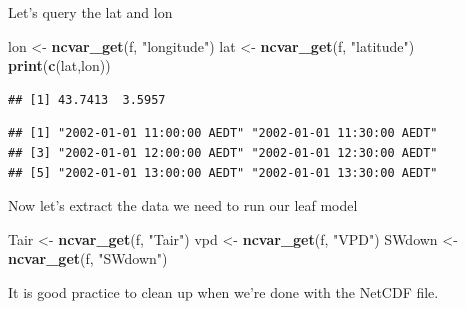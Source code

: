 \documentclass[]{article}
\newenvironment{Shaded}{\begin{snugshade}}{\end{snugshade}}
\newcommand{\DataTypeTok}[1]{\textcolor[rgb]{0.13,0.29,0.53}{#1}}
\newcommand{\DecValTok}[1]{\textcolor[rgb]{0.00,0.00,0.81}{#1}}
\newcommand{\KeywordTok}[1]{\textcolor[rgb]{0.13,0.29,0.53}{\textbf{#1}}}
\newcommand{\NormalTok}[1]{#1}
\newcommand{\OperatorTok}[1]{\textcolor[rgb]{0.81,0.36,0.00}{\textbf{#1}}}
\newcommand{\StringTok}[1]{\textcolor[rgb]{0.31,0.60,0.02}{#1}}
\begin{document}
Let's query the lat and lon

\begin{Shaded}
\begin{Highlighting}[]
\NormalTok{lon <-}\StringTok{ }\KeywordTok{ncvar_get}\NormalTok{(f, }\StringTok{"longitude"}\NormalTok{)}
\NormalTok{lat <-}\StringTok{ }\KeywordTok{ncvar_get}\NormalTok{(f, }\StringTok{"latitude"}\NormalTok{)}
\KeywordTok{print}\NormalTok{(}\KeywordTok{c}\NormalTok{(lat,lon))}
\end{Highlighting}
\end{Shaded}

\begin{verbatim}
## [1] 43.7413  3.5957
\end{verbatim}

\begin{Shaded}
\end{Shaded}

\begin{verbatim}
## [1] "2002-01-01 11:00:00 AEDT" "2002-01-01 11:30:00 AEDT"
## [3] "2002-01-01 12:00:00 AEDT" "2002-01-01 12:30:00 AEDT"
## [5] "2002-01-01 13:00:00 AEDT" "2002-01-01 13:30:00 AEDT"
\end{verbatim}

Now let's extract the data we need to run our leaf model

\begin{Shaded}
\begin{Highlighting}[]
\NormalTok{Tair <-}\StringTok{ }\KeywordTok{ncvar_get}\NormalTok{(f, }\StringTok{"Tair"}\NormalTok{) }
\NormalTok{vpd <-}\StringTok{ }\KeywordTok{ncvar_get}\NormalTok{(f, }\StringTok{"VPD"}\NormalTok{)}
\NormalTok{SWdown <-}\StringTok{ }\KeywordTok{ncvar_get}\NormalTok{(f, }\StringTok{"SWdown"}\NormalTok{)}
\end{Highlighting}
\end{Shaded}

It is good practice to clean up when we're done with the NetCDF file.
\end{document}
